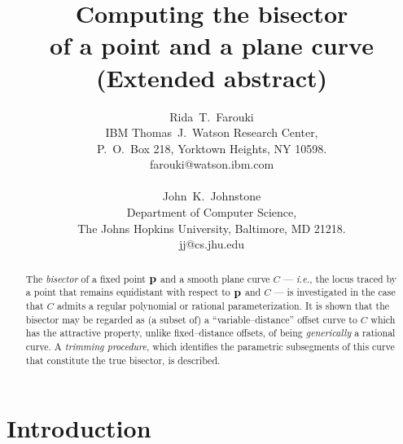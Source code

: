 \newcommand{\figg}[3]{\begin{figure}[htbp]\vspace{#3}\caption{#2}\label{#1}\end{figure}}

\setlength{\oddsidemargin}{0in}
\setlength{\evensidemargin}{0in}
\setlength{\headsep}{0pt}
\setlength{\topmargin}{0in}
\setlength{\textheight}{8.75in}
\setlength{\textwidth}{6.5in}

\title{
Computing the bisector \\
of a point and a plane curve \\
(Extended abstract)
}

\author{
Rida~T.~Farouki \\
IBM Thomas~J.~Watson Research Center, \\
P.~O.~Box 218, Yorktown Heights, NY 10598. \\
farouki@watson.ibm.com \\ \\
John~K.~Johnstone \\
Department of Computer Science, \\
The Johns Hopkins University, Baltimore, MD 21218. \\
jj@cs.jhu.edu
}

\date{}

\maketitle

\begin{abstract}
The {\it bisector\/} of a fixed point ${\bf p}$ and a smooth
plane curve $C$ --- {\it i.e.}, the locus traced by a point
that remains equidistant with respect to ${\bf p}$ and $C$ ---
is investigated in the case that $C$ admits a regular polynomial
or rational parameterization. It is shown that the bisector may be
regarded as (a subset of) a ``variable--distance'' offset curve to
$C$ which has the attractive property, unlike fixed--distance offsets,
of being {\it generically\/} a rational curve. 
A {\it trimming procedure}, which identifies the parametric subsegments
of this curve that constitute the true bisector, is described.
\end{abstract}


\section{Introduction}
\label{intro}

